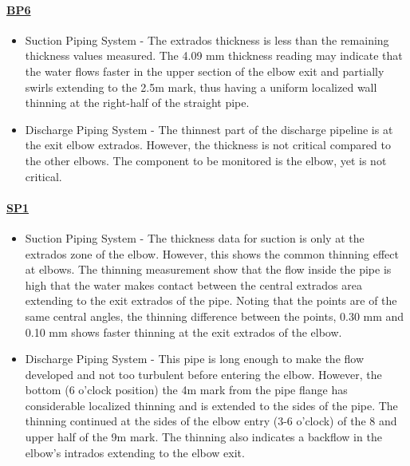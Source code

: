 \paragraph{\underline{BP6}}
\begin{itemize}
	\item Suction Piping System - The extrados thickness is less than the remaining thickness values measured. The 4.09 mm thickness reading may indicate that the water flows faster in the upper section of the elbow exit and partially swirls extending to the 2.5m mark, thus having a uniform localized wall thinning at the right-half of the straight pipe.
	\item	Discharge Piping System - The thinnest part of the discharge pipeline is at the exit elbow extrados. However, the thickness is not critical compared to the other elbows. The component to be monitored is the elbow, yet is not critical.
\end{itemize}

\paragraph{\underline{SP1}}
\begin{itemize}
	\item Suction Piping System - The thickness data for suction is only at the extrados zone of the elbow. However, this shows the common thinning effect at elbows. The thinning measurement show that the flow inside the pipe is high that the water makes contact between the central extrados area extending to the exit extrados of the pipe. Noting that the points are of the same central angles, the thinning difference between the points, 0.30 mm and 0.10 mm shows faster thinning at the exit extrados of the elbow.
	\item	Discharge Piping System - This pipe is long enough to make the flow developed and not too turbulent before entering the elbow. However, the bottom (6 o'clock position) the 4m mark from the pipe flange has considerable localized thinning and is extended to the sides of the pipe. The thinning continued at the sides of the elbow entry (3-6 o'clock) of the 8 and upper half of the 9m mark. The thinning also indicates a backflow in the elbow's intrados extending to the elbow exit.
\end{itemize}

